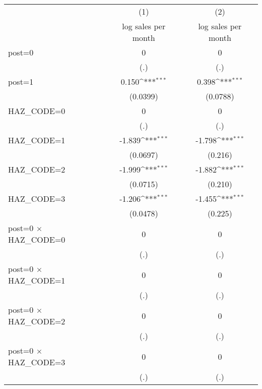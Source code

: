 {
\def\sym#1{\ifmmode^{#1}\else\(^{#1}\)\fi}
\begin{tabular}{l*{2}{c}}
\hline\hline
                    &\multicolumn{1}{c}{(1)}&\multicolumn{1}{c}{(2)}\\
                    &\multicolumn{1}{c}{log sales per month}&\multicolumn{1}{c}{log sales per month}\\
\hline
post=0              &           0         &           0         \\
                    &         (.)         &         (.)         \\
[1em]
post=1              &       0.150\sym{***}&       0.398\sym{***}\\
                    &    (0.0399)         &    (0.0788)         \\
[1em]
HAZ\_CODE=0          &           0         &           0         \\
                    &         (.)         &         (.)         \\
[1em]
HAZ\_CODE=1          &      -1.839\sym{***}&      -1.798\sym{***}\\
                    &    (0.0697)         &     (0.216)         \\
[1em]
HAZ\_CODE=2          &      -1.999\sym{***}&      -1.882\sym{***}\\
                    &    (0.0715)         &     (0.210)         \\
[1em]
HAZ\_CODE=3          &      -1.206\sym{***}&      -1.455\sym{***}\\
                    &    (0.0478)         &     (0.225)         \\
[1em]
post=0 $\times$ HAZ\_CODE=0&           0         &           0         \\
                    &         (.)         &         (.)         \\
[1em]
post=0 $\times$ HAZ\_CODE=1&           0         &           0         \\
                    &         (.)         &         (.)         \\
[1em]
post=0 $\times$ HAZ\_CODE=2&           0         &           0         \\
                    &         (.)         &         (.)         \\
[1em]
post=0 $\times$ HAZ\_CODE=3&           0         &           0         \\
                    &         (.)         &         (.)         \\

\end{tabular}}
